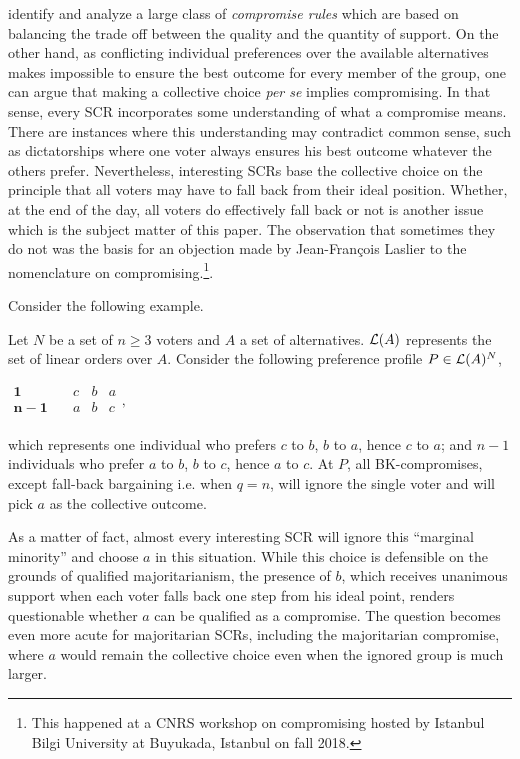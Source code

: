 \documentclass[version=3.21, pagesize, twoside=off, bibliography=totoc, DIV=calc, fontsize=12pt, a4paper]{scrartcl}
\begin{document}
\citet{Merlin2019} identify and analyze a large class of \textit{compromise rules} which are based on balancing the trade off between the quality and the quantity of support. On the other hand, as conflicting
individual preferences over the available alternatives makes impossible to ensure the best outcome for every member of the group, one can argue that making a collective choice \textit{per se} implies compromising. In that sense, every \ac{SCR} incorporates some understanding of what a compromise means. There are instances where this understanding may contradict common sense, such as dictatorships where one voter always ensures his best outcome whatever the others prefer. Nevertheless, interesting \acp{SCR} base the collective choice on the principle that all voters may have to fall back from their ideal position. Whether, at the end of the day, all voters do effectively fall back or not is another issue which is the subject matter of this paper. The observation that sometimes they do not was the basis for an objection made by Jean-François Laslier to the nomenclature on compromising.\footnote{This happened at a CNRS workshop on compromising hosted by Istanbul Bilgi University at Buyukada, Istanbul on fall 2018.}.

Consider the following example.
\begin{example}
	\label{ex:ex1}
	Let $N$ be a set of $n ≥ 3$ voters and $A$ a set of alternatives. $\mathcal{L}(A)$ represents the set of linear orders over $A$. Consider the following preference profile $P\in \mathcal{L}(A)^{N}$,
	\begin{center}
		$
		\begin{array}{cccc}
		\mathbf{1} \quad &c&b&a\\
		\mathbf{n-1} \quad &a&b&c\\
		\end{array},
		$
	\end{center}
	which represents one individual who prefers $c$ to $b$, $b$ to $a$, hence $c$ to $a$; and $n-1$ individuals who prefer $a$ to $b$, $b$ to $c$, hence $a$ to $c$. At $P$, all BK-compromises, except fall-back bargaining i.e. when $q=n$, will ignore the single voter and will pick $a$ as the collective outcome.
\end{example}

As a matter of fact, almost every interesting \ac{SCR} will ignore this “marginal minority” and choose $a$ in this situation. While this choice is defensible on the grounds of qualified majoritarianism, the presence of $b$, which receives unanimous support when each voter falls back one step from his ideal point, renders questionable whether $a$ can be qualified as a compromise. The question becomes even more acute for majoritarian \acp{SCR}, including the majoritarian compromise, where $a$ would
remain the collective choice even when the ignored group is much larger.
\end{document}
